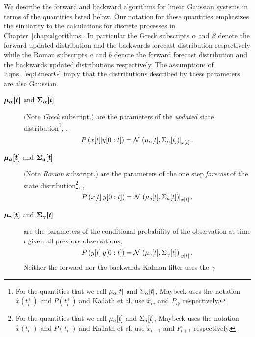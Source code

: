 We describe the forward and backward algorithms for linear Gaussian
systems in terms of the quantities listed below.  Our notation for
these quantities emphasizes the similarity to the calculations for
discrete processes in Chapter~\ref{chap:algorithms}.  In particular
the Greek subscripts $\alpha$ and $\beta$ denote the forward updated
distribution and the backwards forecast distribution respectively while
the Roman subscripts $a$ and $b$ denote the forward forecast
distribution and the backwards updated distributions respectively.
The assumptions of Eqns.~\eqref{eq:LinearG} imply that the
distributions described by these parameters are also Gaussian.
\begin{description}
\item[$\bm{{\mu_\alpha}{[t]}}$ and $\bm{{\Sigma_\alpha}{[t]}}$]
  (Note \emph{Greek} subscript.) are the parameters of the
  \emph{updated} state distribution\footnote{For the quantities that
    we call ${\mu_\alpha}{[t]}$ and ${\Sigma_\alpha}{[t]}$,
    Maybeck\cite{Maybeck82} uses the notation $\hat x(t^+_i)$ and
    $P(t^+_i)$ and Kailath et al.\cite{KSH00} use $\hat x_{i|i}$ and
    $P_{i|i}$ respectively.}, \ie,
  \begin{equation*}
    P\left({x}{[t]}|y[0:t] \right) =
    {\mathcal{N}}\left.\left({\mu_\alpha}{[t]},{\Sigma_\alpha}{[t]}\right)\right|_{{x}{[t]}}.
  \end{equation*}
\item[$\bm{{\mu_a}{[t]}}$ and $\bm{{\Sigma_a}{[t]}}$] (Note
  \emph{Roman} subscript.) are the parameters of the one step
  \emph{forecast} of the state distribution\footnote{For the
    quantities that we call ${\mu_a}{[t]}$ and ${\Sigma_a}{[t]}$,
    Maybeck\cite{Maybeck82} uses the notation $\hat x(t^-_i)$ and
    $P(t^-_i)$ and Kailath et al.\cite{KSH00} use $\hat x_{i+1}$ and
    $P_{i+1}$ respectively.}, \ie,
  \begin{equation*}
    P \left({x}{[t]}|y[0:t] \right) =
    {\mathcal{N}}\left.\left({\mu_a}{[t]},{\Sigma_a}{[t]}\right)\right|_{{x}{[t]}}.
  \end{equation*}
\item[$\bm{{\mu_\gamma}{[t]}}$ and $\bm{{\Sigma_\gamma}{[t]}}$] are
  the parameters of the conditional probability of the observation at
  time $t$ given all previous observations, \ie
  \begin{equation*}
    P\left({y}{[t]}|y[0:t] \right) =
    {\mathcal{N}}\left.\left({\mu_\gamma}{[t]},{\Sigma_\gamma}{[t]}\right)\right|_{{y}{[t]}}.
  \end{equation*}
  Neither the forward nor the backwards Kalman filter uses the $\gamma$

\end{description}
